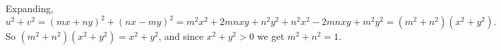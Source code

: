 Expanding,
\[
u^2+v^2=(mx+ny)^2+(nx-my)^2=m^2x^2+2mnxy+n^2y^2+n^2x^2-2mnxy+m^2y^2=(m^2+n^2)(x^2+y^2).
\]
So $(m^2+n^2)(x^2+y^2)=x^2+y^2$, and since $x^2+y^2>0$ we get $m^2+n^2=\boxed{1}$.
